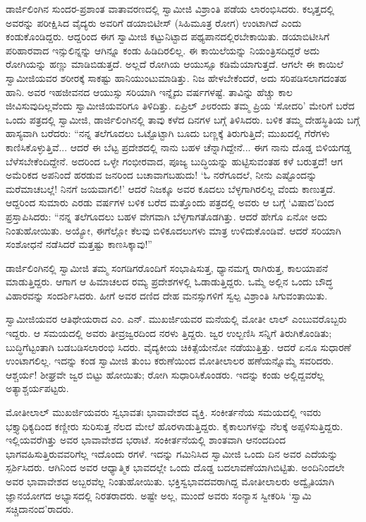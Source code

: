 ಡಾರ್ಜಿಲಿಂಗಿನ ಸುಂದರ-ಪ್ರಶಾಂತ ವಾತಾವರಣದಲ್ಲಿ ಸ್ವಾಮೀಜಿ ವಿಶ್ರಾಂತಿ ಪಡೆಯ ಲಾರಂಭಿಸಿದರು. ಕಲ್ಕತ್ತದಲ್ಲಿ ಅವರನ್ನು ಪರೀಕ್ಷಿಸಿದ ವೈದ್ಯರು ಅವರಿಗೆ ಡಯಾಬಿಟೀಸ್ (ಸಿಹಿಮೂತ್ರ ರೋಗ) ಉಂಟಾಗಿದೆ ಎಂದು ಕಂಡುಕೊಂಡಿದ್ದರು. ಆದ್ದರಿಂದ ಈಗ ಸ್ವಾಮೀಜಿ ಕಟ್ಟುನಿಟ್ಟಾದ ಪಥ್ಯಪಾನದಲ್ಲಿರಬೇಕಾಯಿತು. ಡಯಾಬಿಟೀಸಿಗೆ ಪರಿಹಾರವಾದ ಇನ್ಸುಲಿನ್ನನ್ನು ಆಗಿನ್ನೂ ಕಂಡು ಹಿಡಿದಿರಲಿಲ್ಲ. ಈ ಕಾಯಿಲೆಯನ್ನು ನಿಯಂತ್ರಿಸದಿದ್ದರೆ ಅದು ರೋಗಿಯನ್ನು ಹಣ್ಣು ಮಾಡಿಬಿಡುತ್ತದೆ. ಅಲ್ಲದೆ ರೋಗಿಯ ಆಯುಸ್ಸೂ ಕಡಿಮೆಯಾಗುತ್ತದೆ. ಆಗಲೇ ಈ ಕಾಯಿಲೆ ಸ್ವಾಮೀಜಿಯವರ ಶರೀರಕ್ಕೆ ಸಾಕಷ್ಟು ಹಾನಿಯುಂಟುಮಾಡಿತ್ತು. ನಿಜ ಹೇಳಬೇಕೆಂದರೆ, ಅದು ಸರಿಪಡಿಸಲಾಗದಂತಹ ಹಾನಿ. ಅವರ ಇಹಜೀವನದ ಆಯುಸ್ಸು ಸರಿಯಾಗಿ ಇನ್ನೈದು ವರ್ಷಗಳಷ್ಟೆ. ತಾವಿನ್ನು ಹೆಚ್ಚು ಕಾಲ ಜೀವಿಸುವುದಿಲ್ಲವೆಂದು ಸ್ವಾಮೀಜಿಯವರಿಗೂ ತಿಳಿದಿತ್ತು. ಏಪ್ರಿಲ್ ೨೮ರಂದು ತಮ್ಮ ಪ್ರಿಯ ‘ಸೋದರಿ’ ಮೇರಿಗೆ ಬರೆದ ಒಂದು ಪತ್ರದಲ್ಲಿ ಸ್ವಾಮೀಜಿ, ಡಾರ್ಜಿಲಿಂಗಿನಲ್ಲಿ ತಾವು ಕಳೆದ ದಿನಗಳ ಬಗ್ಗೆ ತಿಳಿಸಿದರು. ಬಳಿಕ ತಮ್ಮ ದೇಹಸ್ಥಿತಿಯ ಬಗ್ಗೆ ಹಾಸ್ಯವಾಗಿ ಬರೆದರು: “ನನ್ನ ತಲೆಗೂದಲು ಒಟ್ಟೊಟ್ಟಾಗಿ ಬೂದು ಬಣ್ಣಕ್ಕೆ ತಿರುಗುತ್ತಿದೆ; ಮುಖದಲ್ಲಿ ಗೆರೆಗಳು ಕಾಣಿಸಿಕೊಳ್ಳುತ್ತಿವೆ... ಆದರೆ ಈ ಬೆಟ್ಟ ಪ್ರದೇಶದಲ್ಲಿ ನಾನು ಬಹಳ ಚೆನ್ನಾಗಿದ್ದೇನೆ... ಈಗ ನಾನು ದೊಡ್ಡ ಬಿಳಿಯಗಡ್ಡ ಬೆಳೆಸಬೇಕೆಂದಿದ್ದೇನೆ. ಅದರಿಂದ ಒಳ್ಳೇ ಗಂಭೀರವಾದ, ಪೂಜ್ಯ ಬುದ್ಧಿಯನ್ನು ಹುಟ್ಟಿಸುವಂತಹ ಕಳೆ ಬರುತ್ತದೆ! ಆಗ ಅಮೆರಿಕದ ಅಪನಿಂದೆ ಹರಡುವ ಜನರಿಂದ ಬಚಾವಾಗಬಹುದು! ‘ಓ ನರೆಗೂದಲೆ, ನೀನು ಎಷ್ಟೊಂದನ್ನು ಮರೆಮಾಚಬಲ್ಲೆ! ನಿನಗೆ ಜಯವಾಗಲಿ!’ ಆದರೆ ನಿಜಕ್ಕೂ ಅವರ ಕೂದಲು ಬೆಳ್ಳಗಾಗಿರಲಿಲ್ಲ ವೆಂದು ಕಾಣುತ್ತದೆ. ಆದ್ದರಿಂದ ಸುಮಾರು ಎರಡು ವರ್ಷಗಳ ಬಳಿಕ ಬರೆದ ಮತ್ತೊಂದು ಪತ್ರದಲ್ಲಿ ಅವರು ಆ ಬಗ್ಗೆ ‘ವಿಷಾದ’ದಿಂದ ಪ್ರಸ್ತಾಪಿಸಿದರು: “ನನ್ನ ತಲೆಗೂದಲು ಬಹಳ ವೇಗವಾಗಿ ಬೆಳ್ಳಗಾಗತೊಡಗಿತ್ತು. ಆದರೆ ಹೇಗೊ ಏನೋ ಅದು ನಿಂತುಹೋಯಿತು. ಅಯ್ಯೋ, ಈಗೆಲ್ಲೋ ಕೆಲವು ಬಿಳಿಕೂದಲುಗಳು ಮಾತ್ರ ಉಳಿದುಕೊಂಡಿವೆ. ಆದರೆ ಸರಿಯಾಗಿ ಸಂಶೋಧನೆ ನಡೆಸಿದರೆ ಮತ್ತಷ್ಟು ಕಾಣಸಿಕ್ಕಾವು!”

ಡಾರ್ಜಿಲಿಂಗಿನಲ್ಲಿ ಸ್ವಾಮೀಜಿ ತಮ್ಮ ಸಂಗಡಿಗರೊಂದಿಗೆ ಸಂಭಾಷಿಸುತ್ತ, ಧ್ಯಾನಮಗ್ನ ರಾಗಿರುತ್ತ, ಕಾಲಯಾಪನೆ ಮಾಡುತ್ತಿದ್ದರು. ಆಗಾಗ ಆ ಹಿಮಾಚಲದ ರಮ್ಯ ಪ್ರದೇಶಗಳಲ್ಲಿ ಓಡಾಡುತ್ತಿದ್ದರು. ಒಮ್ಮೆ ಅಲ್ಲಿನ ಒಂದು ಬೌದ್ಧ ವಿಹಾರವನ್ನು ಸಂದರ್ಶಿಸಿದರು. ಹೀಗೆ ಅವರ ದಣಿದ ದೇಹ ಮನಸ್ಸುಗಳಿಗೆ ಸ್ವಲ್ಪ ವಿಶ್ರಾಂತಿ ಸಿಗುವಂತಾಯಿತು.

ಸ್ವಾಮೀಜಿಯವರ ಆತಿಥೇಯರಾದ ಎಂ. ಎನ್. ಮುಖರ್ಜಿಯವರ ಮನೆಯಲ್ಲಿ ಮೋತೀ ಲಾಲ್ ಎಂಬುವರೊಬ್ಬರು ಇದ್ದರು. ಆ ಸಮಯದಲ್ಲಿ ಅವರು ತೀವ್ರಜ್ವರದಿಂದ ನರಳು ತ್ತಿದ್ದರು. ಜ್ವರ ಉಲ್ಬಣಿಸಿ ಸನ್ನಿಗೆ ತಿರುಗಿಕೊಂಡಿತು; ಬುದ್ಧಿಗೆಟ್ಟಂತಾಗಿ ಬಡಬಡಿಸಲಾರಂಭಿ ಸಿದರು. ವೈದ್ಯಕೀಯ ಚಿಕಿತ್ಸೆಯೇನೋ ನಡೆಯುತ್ತಿತ್ತು. ಆದರೆ ಏನೂ ಸುಧಾರಣೆ ಉಂಟಾಗಲಿಲ್ಲ. ಇದನ್ನು ಕಂಡ ಸ್ವಾಮೀಜಿ ತುಂಬ ಕರುಣೆಯಿಂದ ಮೋತೀಲಾಲರ ಹಣೆಯನ್ನೊಮ್ಮೆ ಸವರಿದರು. ಆಶ್ಚರ್ಯ! ಶೀಘ್ರವೇ ಜ್ವರ ಬಿಟ್ಟು ಹೋಯಿತು; ರೋಗಿ ಸುಧಾರಿಸಿಕೊಂಡರು. ಇದನ್ನು ಕಂಡು ಅಲ್ಲಿದ್ದವರೆಲ್ಲ ಅತ್ಯಾಶ್ಚರ್ಯಪಟ್ಟರು.

ಮೋತೀಲಾಲ್ ಮುಖರ್ಜಿಯವರು ಸ್ವಭಾವತಃ ಭಾವಾವೇಶದ ವ್ಯಕ್ತಿ. ಸಂಕೀರ್ತನೆಯ ಸಮಯದಲ್ಲಿ ಇವರು ಭಕ್ತ್ಯಾಧಿಕ್ಯದಿಂದ ಕಣ್ಣೀರು ಸುರಿಸುತ್ತ ನೆಲದ ಮೇಲೆ ಹೊರಳಾಡುತ್ತಿದ್ದರು. ಕೈಕಾಲುಗಳನ್ನು ನೆಲಕ್ಕೆ ಅಪ್ಪಳಿಸುತ್ತಿದ್ದರು. ಇಲ್ಲಿಯವರೆಗಿತ್ತು ಅವರ ಭಾವಾವೇಶದ ಭರಾಟೆ. ಸಂಕೀರ್ತನೆಯಲ್ಲಿ ಶಾಂತವಾಗಿ ಆನಂದದಿಂದ ಭಾಗವಹಿಸುತ್ತಿರುವವರಿಗೆಲ್ಲ ಇದೊಂದು ರಗಳೆ. ಇದನ್ನು ಗಮಿನಿಸಿದ ಸ್ವಾಮೀಜಿ ಒಂದು ದಿನ ಅವರ ಎದೆಯನ್ನು ಸ್ಪರ್ಶಿಸಿದರು. ಆಗಿನಿಂದ ಅವರ ಆಧ್ಯಾತ್ಮಿಕ ಭಾವದಲ್ಲೇ ಒಂದು ದೊಡ್ಡ ಬದಲಾವಣೆಯಾಗಿಬಿಟ್ಟಿತು. ಅಂದಿನಿಂದಲೇ ಅವರ ಭಾವಾವೇಶದ ಅಬ್ಬರವೆಲ್ಲ ನಿಂತುಹೋಯಿತು. ಭಕ್ತಿಸ್ವಭಾವದವರಾಗಿದ್ದ ಮೋತೀಲಾಲರು ಅದ್ವೈತಿಯಾಗಿ ಜ್ಞಾನಯೋಗದ ಅಭ್ಯಾಸದಲ್ಲಿ ನಿರತರಾದರು. ಅಷ್ಟೇ ಅಲ್ಲ, ಮುಂದೆ ಅವರು ಸಂನ್ಯಾಸ ಸ್ವೀಕರಿಸಿ ‘ಸ್ವಾಮಿ ಸಚ್ಚಿದಾನಂದ’ರಾದರು.

